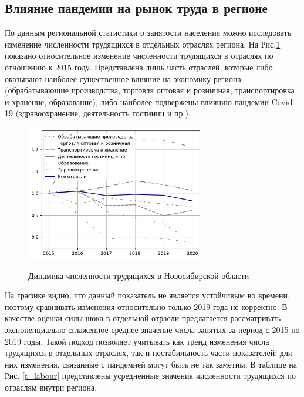 \documentclass[12pt, a4paper]{article}
\begin{document}
\subsection{Влияние пандемии на рынок труда в регионе}
По данным региональной статистики о занятости населения \cite{RegionStat}  можно исследовать изменение численности трудящихся в отдельных отраслях региона. На Рис.\ref{labour} показано относительное изменение численности трудящихся в отраслях по отношению к 2015 году. Представлена лишь часть отраслей, которые либо оказывают наиболее существенное влияние на экономику региона (обрабатывающие производства, торговля оптовая и розничная, транспортировка и хранение, образование), либо наиболее подвержены влиянию  пандемии Covid-19 (здравоохранение, деятельность гостиниц и пр.).
\begin{figure}[h]
\center
\includegraphics[width=0.7\textwidth]{pictures/labour_branches.png}\
\caption{Динамика численности трудящихся в Новосибирской области}
\label{labour}
\end{figure}

На графике видно, что данный показатель не является устойчивым во времени, поэтому сравнивать изменения относительно только 2019 года не корректно. В качестве оценки силы шока в отдельной отрасли предлагается рассматривать экспоненциально сглаженное среднее значение числа занятых за период с 2015 по 2019 годы. Такой подход позволяет учитывать как  тренд изменения числа трудящихся в отдельных отраслях, так и нестабильность части показателей: для них изменения, связанные с пандемией могут быть не так заметны. В таблице на Рис. \ref{t_labour} представлены усредненные значения численности трудящихся по отраслям внутри региона.
 
\end{document}
